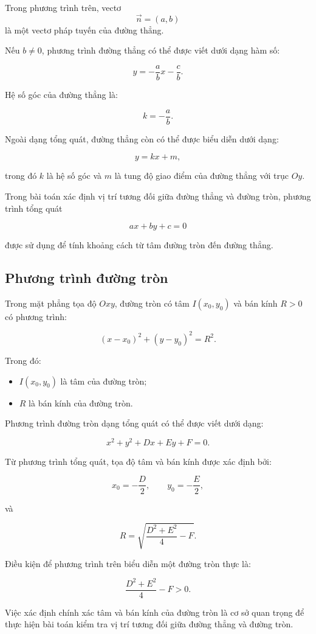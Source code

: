\documentclass[12pt,a4paper]{article}
\begin{document}
Trong phương trình trên, vectơ
\[
\vec{n}=(a,b)
\]
là một vectơ pháp tuyến của đường thẳng.

Nếu $b\neq0$, phương trình đường thẳng có thể được viết dưới dạng hàm số:

\[
y=-\frac{a}{b}x-\frac{c}{b}.
\]

Hệ số góc của đường thẳng là:

\[
k=-\frac{a}{b}.
\]

Ngoài dạng tổng quát, đường thẳng còn có thể được biểu diễn dưới dạng:

\[
y=kx+m,
\]

trong đó $k$ là hệ số góc và $m$ là tung độ giao điểm của đường thẳng với trục $Oy$.

Trong bài toán xác định vị trí tương đối giữa đường thẳng và đường tròn, phương trình tổng quát

\[
ax+by+c=0
\]

được sử dụng để tính khoảng cách từ tâm đường tròn đến đường thẳng.


\subsection{Phương trình đường tròn}

Trong mặt phẳng tọa độ $Oxy$, đường tròn có tâm $I(x_0,y_0)$ và bán kính $R>0$ có phương trình:

\[
(x-x_0)^2+(y-y_0)^2=R^2.
\]

Trong đó:

\begin{itemize}
    \item $I(x_0,y_0)$ là tâm của đường tròn;
    \item $R$ là bán kính của đường tròn.
\end{itemize}

Phương trình đường tròn dạng tổng quát có thể được viết dưới dạng:

\[
x^2+y^2+Dx+Ey+F=0.
\]

Từ phương trình tổng quát, tọa độ tâm và bán kính được xác định bởi:

\[
x_0=-\frac{D}{2},
\qquad
y_0=-\frac{E}{2},
\]

và

\[
R=\sqrt{\frac{D^2+E^2}{4}-F}.
\]

Điều kiện để phương trình trên biểu diễn một đường tròn thực là:

\[
\frac{D^2+E^2}{4}-F>0.
\]

Việc xác định chính xác tâm và bán kính của đường tròn là cơ sở quan trọng để thực hiện bài toán kiểm tra vị trí tương đối giữa đường thẳng và đường tròn.
\end{document}
